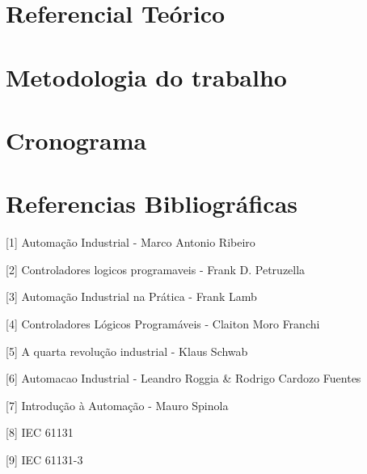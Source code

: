 \documentclass[a4paper, 12pt]{article}
\begin{document}
\section{Referencial Teórico}

\section{Metodologia do trabalho}

\section{Cronograma}

\section{Referencias Bibliográficas}

[1] Automação Industrial - Marco Antonio Ribeiro

[2] Controladores logicos programaveis - Frank D. Petruzella

[3] Automação Industrial na Prática - Frank Lamb

[4] Controladores Lógicos Programáveis - Claiton Moro Franchi

[5] A quarta revolução industrial - Klaus Schwab

[6] Automacao Industrial - Leandro Roggia \& Rodrigo Cardozo Fuentes

[7] Introdução à Automação - Mauro Spinola

[8] IEC 61131

[9] IEC 61131-3
\end{document}
